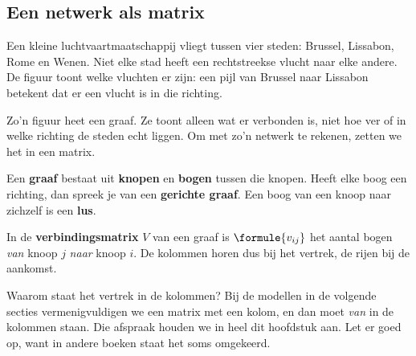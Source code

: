 \subsection{Een netwerk als matrix}

Een kleine luchtvaartmaatschappij vliegt tussen vier steden: Brussel, Lissabon, Rome en Wenen. Niet elke stad heeft een rechtstreekse vlucht naar elke andere. De figuur toont welke vluchten er zijn: een pijl van Brussel naar Lissabon betekent dat er een vlucht is in die richting.

Zo'n figuur heet een graaf. Ze toont alleen wat er verbonden is, niet hoe ver of in welke richting de steden echt liggen. Om met zo'n netwerk te rekenen, zetten we het in een matrix.

\begin{theorie}
Een \textbf{\textcolor{accent}{graaf}} bestaat uit \textbf{\textcolor{accent}{knopen}} en \textbf{\textcolor{accent}{bogen}} tussen die knopen. Heeft elke boog een richting, dan spreek je van een \textbf{\textcolor{accent}{gerichte graaf}}. Een boog van een knoop naar zichzelf is een \textbf{\textcolor{accent}{lus}}.

\vspace{1mm}
In de \textbf{\textcolor{accent}{verbindingsmatrix}} $V$ van een graaf is $\formule{v_{ij}}$ het aantal bogen \emph{van} knoop $j$ \emph{naar} knoop $i$. De kolommen horen dus bij het vertrek, de rijen bij de aankomst.
\end{theorie}

Waarom staat het vertrek in de kolommen? Bij de modellen in de volgende secties vermenigvuldigen we een matrix met een kolom, en dan moet \textit{van} in de kolommen staan. Die afspraak houden we in heel dit hoofdstuk aan. Let er goed op, want in andere boeken staat het soms omgekeerd.

